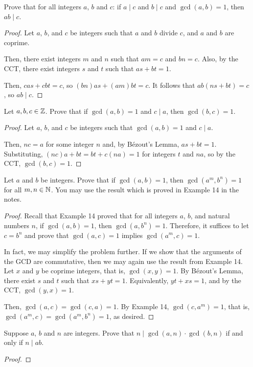 \question Prove that for all integers $a$, $b$ and $c$:
if $a \mid c$ and $b \mid c$ and $\gcd(a, b) = 1$, then $ab \mid c$.
\begin{proof}
  Let $a$, $b$, and $c$ be integers such that $a$ and $b$ divide $c$, and $a$ and $b$ are coprime.

  Then, there exist integers $m$ and $n$ such that $am=c$ and $bn=c$.
  Also, by the CCT, there exist integers $s$ and $t$ such that $as+bt=1$.

  Then, $cas+cbt=c$, so $(bn)as+(am)bt=c$.
  It follows that $ab(ns+bt)=c$, so $ab \mid c$.
\end{proof}


\question Let $a,b,c\in\mathbb{Z}$. Prove that if $\gcd(a, b) = 1$ and $c \mid a$, then $\gcd(b, c) = 1$.
\begin{proof}
  Let $a$, $b$, and $c$ be integers such that $\gcd(a,b)=1$ and $c \mid a$.

  Then, $nc = a$ for some integer $n$ and, by Bézout's Lemma, $as+bt=1$.
  Substituting, $(nc)a+bt=bt+c(na)=1$ for integers $t$ and $na$, so by the CCT, $\gcd(b,c)=1$.
\end{proof}


\question Let $a$ and $b$ be integers.
Prove that if $\gcd(a, b) = 1$, then $\gcd(a^m, b^n) = 1$ for all $m,n\in\mathbb{N}$.
You may use the result which is proved in Example 14 in the notes.
\begin{proof}
  Recall that Example 14 proved that for all integers $a$, $b$, and natural numbers $n$,
  if $\gcd(a, b)=1$, then $\gcd(a, b^n)=1$.
  Therefore, it suffices to let $c=b^n$ and prove that $\gcd(a, c)=1$ implies $\gcd(a^m, c)=1$.

  In fact, we may simplify the problem further.
  If we show that the arguments of the GCD are commutative,
  then we may again use the result from Example 14.
  Let $x$ and $y$ be coprime integers, that is, $\gcd(x,y)=1$.
  By Bézout's Lemma, there exist $s$ and $t$ such that $xs+yt=1$.
  Equivalently, $yt+xs=1$, and by the CCT, $\gcd(y,x)=1$.

  Then, $\gcd(a,c)=\gcd(c,a)=1$.
  By Example 14, $\gcd(c,a^m)=1$, that is, $\gcd(a^m,c)=\gcd(a^m,b^n)=1$, as desired.
\end{proof}


\question Suppose $a$, $b$ and $n$ are integers.
Prove that $n \mid \gcd(a, n) \cdot \gcd(b, n)$ if and only if $n \mid ab$.
\begin{proof}
\end{proof}


